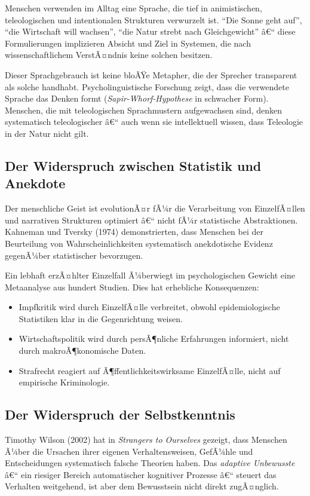 ﻿\documentclass[12pt, a4paper]{article}
\begin{document}
Menschen verwenden im Alltag eine Sprache, die tief in animistischen,
teleologischen und intentionalen Strukturen verwurzelt ist. \enquote{Die Sonne
geht auf}, \enquote{die Wirtschaft will wachsen}, \enquote{die Natur strebt
nach Gleichgewicht} â€“ diese Formulierungen implizieren Absicht und Ziel in
Systemen, die nach wissenschaftlichem VerstÃ¤ndnis keine solchen besitzen.

Dieser Sprachgebrauch ist keine bloÃŸe Metapher, die der Sprecher transparent
als solche handhabt. Psycholinguistische Forschung zeigt, dass die verwendete
Sprache das Denken formt (\emph{Sapir-Whorf-Hypothese} in schwacher Form).
Menschen, die mit teleologischen Sprachmustern aufgewachsen sind, denken
systematisch teleologischer â€“ auch wenn sie intellektuell wissen, dass
Teleologie in der Natur nicht gilt.

\subsection{Der Widerspruch zwischen Statistik und Anekdote}

Der menschliche Geist ist evolutionÃ¤r fÃ¼r die Verarbeitung von EinzelfÃ¤llen und
narrativen Strukturen optimiert â€“ nicht fÃ¼r statistische Abstraktionen.
Kahneman und Tversky (1974) demonstrierten, dass Menschen bei der Beurteilung
von Wahrscheinlichkeiten systematisch anekdotische Evidenz gegenÃ¼ber
statistischer bevorzugen.

Ein lebhaft erzÃ¤hlter Einzelfall Ã¼berwiegt im psychologischen Gewicht eine
Metaanalyse aus hundert Studien. Dies hat erhebliche Konsequenzen:

\begin{itemize}
  \item Impfkritik wird durch EinzelfÃ¤lle verbreitet, obwohl epidemiologische
    Statistiken klar in die Gegenrichtung weisen.
  \item Wirtschaftspolitik wird durch persÃ¶nliche Erfahrungen informiert,
    nicht durch makroÃ¶konomische Daten.
  \item Strafrecht reagiert auf Ã¶ffentlichkeitswirksame EinzelfÃ¤lle, nicht
    auf empirische Kriminologie.
\end{itemize}

\subsection{Der Widerspruch der Selbstkenntnis}

Timothy Wilson (2002) hat in \textit{Strangers to Ourselves} gezeigt, dass
Menschen Ã¼ber die Ursachen ihrer eigenen Verhaltensweisen, GefÃ¼hle und
Entscheidungen systematisch falsche Theorien haben. Das \emph{adaptive Unbewusste}
â€“ ein riesiger Bereich automatischer kognitiver Prozesse â€“ steuert das Verhalten
weitgehend, ist aber dem Bewusstsein nicht direkt zugÃ¤nglich.
\end{document}
